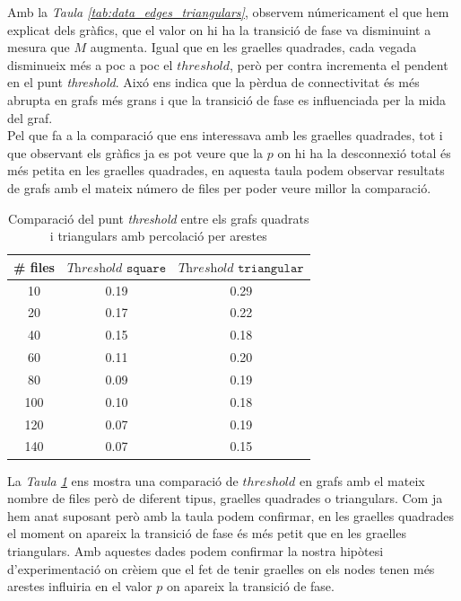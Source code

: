 \documentclass[a4paper]{article}
\begin{document}
	Amb la \textit{Taula \ref{tab:data_edges_triangulars}}, observem númericament el que hem explicat dels gràfics, que el valor on hi ha la transició de fase va disminuint a mesura que $M$ augmenta. Igual que en les graelles quadrades, cada vegada disminueix més a poc a poc el $threshold$, però per contra incrementa el pendent en el punt \textit{threshold}. Aixó ens indica que la pèrdua de connectivitat és més abrupta en grafs més grans i que la transició de fase es influenciada per la mida del graf. \\
	
	Pel que fa a la comparació que ens interessava amb les graelles quadrades, tot i que observant els gràfics ja es pot veure que la $p$ on hi ha la desconnexió total és més petita en les graelles quadrades, en aquesta taula podem observar resultats de grafs amb el mateix número de files per poder veure millor la comparació.
	
	\begin{table}[H]
		\centering
		\begin{tabular}{|c|c|c|}
			\hline
			\rowcolor{gray!30}
			\# files & $\textit{Threshold}\texttt{ square}$ &$\textit{Threshold}\texttt{ triangular}$ \\ \hline
			10 & 0.19 & 0.29 \\ \hline
			20 & 0.17 & 0.22 \\ \hline
			40 & 0.15 & 0.18 \\ \hline
			60 & 0.11 & 0.20 \\ \hline
			80 & 0.09 & 0.19 \\ \hline
			100 & 0.10 & 0.18\\ \hline
			120 & 0.07 & 0.19 \\ \hline
			140 & 0.07 & 0.15 \\ \hline
		\end{tabular}
		\caption{Comparació del punt \textit{threshold} entre els grafs quadrats i triangulars amb percolació per arestes}
		\label{tab:comparacio_threshold_square_triangular_edges}
	\end{table}
	
	La \textit{Taula \ref{tab:comparacio_threshold_square_triangular_edges}} ens mostra una comparació de $threshold$ en grafs amb el mateix nombre de files però de diferent tipus, graelles quadrades o triangulars. Com ja hem anat suposant però amb la taula podem confirmar, en les graelles quadrades el moment on apareix la transició de fase és més petit que en les graelles triangulars. Amb aquestes dades podem confirmar la nostra hipòtesi d'experimentació on crèiem que el fet de tenir graelles on els nodes tenen més arestes influiria en el valor $p$ on apareix la transició de fase.
	
\end{document}
